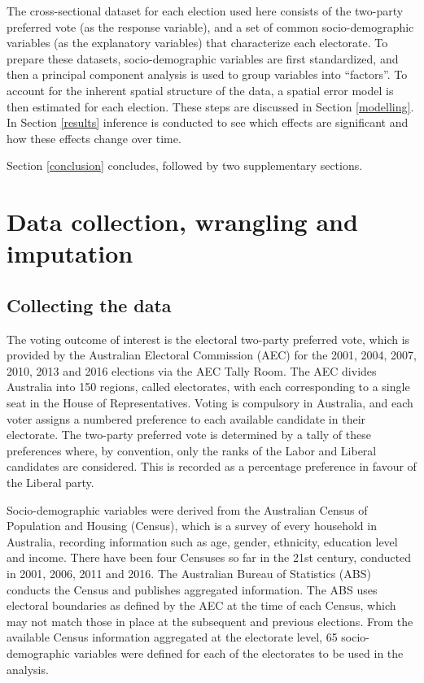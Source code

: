 \documentclass[11pt,a4paper,]{article}
\begin{document}
The cross-sectional dataset for each election used here consists of the two-party preferred vote (as the response variable), and a set of common socio-demographic variables (as the explanatory variables) that characterize each electorate. To prepare these datasets, socio-demographic variables are first standardized, and then a principal component analysis is used to group variables into ``factors''. To account for the inherent spatial structure of the data, a spatial error model is then estimated for each election. These steps are discussed in Section \ref{modelling}. In Section \ref{results} inference is conducted to see which effects are significant and how these effects change over time.

Section \ref{conclusion} concludes, followed by two supplementary sections.

\hypertarget{data}{%
\section{Data collection, wrangling and imputation}\label{data}}

\hypertarget{collecting-the-data}{%
\subsection{Collecting the data}\label{collecting-the-data}}

The voting outcome of interest is the electoral two-party preferred vote, which is provided by the Australian Electoral Commission (AEC) for the 2001, 2004, 2007, 2010, 2013 and 2016 elections via the AEC Tally Room. The AEC divides Australia into 150 regions, called electorates, with each corresponding to a single seat in the House of Representatives. Voting is compulsory in Australia, and each voter assigns a numbered preference to each available candidate in their electorate. The two-party preferred vote is determined by a tally of these preferences where, by convention, only the ranks of the Labor and Liberal candidates are considered. This is recorded as a percentage preference in favour of the Liberal party.

Socio-demographic variables were derived from the Australian Census of Population and Housing (Census), which is a survey of every household in Australia, recording information such as age, gender, ethnicity, education level and income. There have been four Censuses so far in the 21st century, conducted in 2001, 2006, 2011 and 2016. The Australian Bureau of Statistics (ABS) conducts the Census and publishes aggregated information. The ABS uses electoral boundaries as defined by the AEC at the time of each Census, which may not match those in place at the subsequent and previous elections. From the available Census information aggregated at the electorate level, 65 socio-demographic variables were defined for each of the electorates to be used in the analysis.
\end{document}
